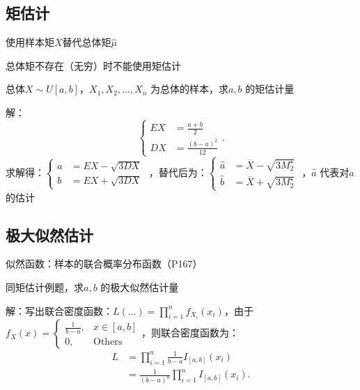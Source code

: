 \subsection{矩估计}%
\label{sub:矩估计}
使用样本矩$\overline{X}$替代总体矩$\hat{\mu}$ 
\begin{notation}
    总体矩不存在（无穷）时不能使用矩估计
\end{notation}
\begin{eg}
    总体$X\sim U[a,b]$，$X_1,X_2,\ldots ,X_{n}$ 为总体的样本，求$a,b$ 的矩估计量
\end{eg}
解：\[
    \begin{cases}
        EX&= \frac{a+b}{2} \\
        DX&= \frac{\left( b-a \right)^2 }{12}
    \end{cases}
.\]
求解得：$\begin{cases}
    a&= EX-\sqrt{3DX} \\
    b&= EX+\sqrt{3DX}
\end{cases}$ ，替代后为：$\begin{cases}
    \hat{a}&= \overline{X}-\sqrt{3M_2^\star } \\
    \hat{b}&= \overline{X}+\sqrt{3M_2^\star }
\end{cases}$ ，$\hat{a}$ 代表对$a$ 的估计
\subsection{极大似然估计}%
\label{sub:极大似然估计}
似然函数：样本的联合概率分布函数（P167）
\begin{eg}
    同矩估计例题，求$a,b$ 的极大似然估计量
\end{eg}
解：写出联合密度函数：$L\left( \ldots  \right)=\prod_{i=1}^{n} f_{X_{i}}\left( x_{i} \right)$，由于$f_X\left( x \right)=\begin{cases}
    \frac{1}{b-a},&x\in [a,b]\\
    0,&\text{Others}
\end{cases}$，则联合密度函数为：
\begin{align*}
    L&=\prod_{i=1}^{n} \frac{1}{b-a}I_{[a,b]}\left( x_{i} \right)\\
     &= \frac{1}{\left( b-a \right)^n} \prod_{i=1}^{n} I_{[a,b]}\left( x_{i} \right)
.\end{align*}
